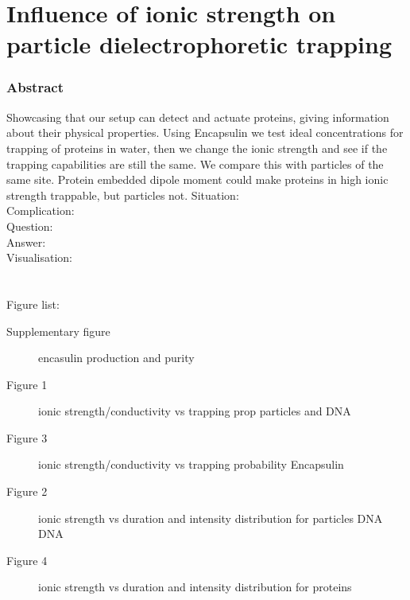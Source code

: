 \section{Influence of ionic strength on particle dielectrophoretic trapping}
\subsubsection{Abstract}
Showcasing that our setup can detect and actuate proteins, giving information about their physical properties. Using Encapsulin we test ideal concentrations for trapping of proteins in water, then we change the ionic strength and see if the trapping capabilities are still the same. We compare this with particles of the same site.
Protein embedded dipole moment could make proteins in high ionic strength trappable, but particles not. 
    Situation: \\
	Complication: \\
	Question: \\
	Answer: \\
	Visualisation: \\
    \\\\
    Figure list:
    \begin{description}
        \item [Supplementary figure] encasulin production and purity
        \item [Figure 1] ionic strength/conductivity vs trapping prop particles and DNA
        \item [Figure 3] ionic strength/conductivity vs trapping probability Encapsulin
        \item [Figure 2] ionic strength vs duration and intensity distribution for particles DNA DNA
        \item [Figure 4] ionic strength vs duration and intensity distribution for proteins
    \end{description}
